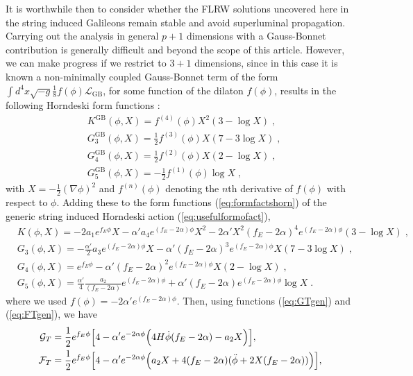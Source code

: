 \documentclass[amsmath,amssymb,11pt]{article}
\newcommand{\beq}{\begin{equation}}
\newcommand{\eeq}{\end{equation}}
\begin{document}
It is worthwhile then to consider whether the FLRW solutions uncovered here in the string induced Galileons remain stable and avoid superluminal propagation. Carrying out the analysis in general $p+1$ dimensions with a Gauss-Bonnet contribution is generally difficult and beyond the scope of this article. However, we can make progress if we restrict to $3+1$ dimensions, since in this case it is known a non-minimally coupled Gauss-Bonnet term of the form $\int d^{4}x\sqrt{-g}\frac{1}{8}f(\phi)\mathcal{L}_{\text{GB}}$, for some function of the dilaton $f(\phi)$, results in the following Horndeski form functions \cite{Kobayashi:2011nu,DeFelice:2011uc}:
\beq 
\begin{split}
&K^{\text{GB}}(\phi,X)=f^{(4)}(\phi)X^{2}(3-\log X)\;,\\
&G^{\text{GB}}_{3}(\phi,X)=\frac{1}{2}f^{(3)}(\phi)X(7-3\log X)\;,\\
&G^{\text{GB}}_{4}(\phi,X)=\frac{1}{2}f^{(2)}(\phi)X(2-\log X)\;,\\
&G^{\text{GB}}_{5}(\phi,X)=-\frac{1}{2}f^{(1)}(\phi)\log X\;,
\end{split}
\eeq
with $X=-\frac{1}{2}(\nabla\phi)^{2}$ and $f^{(n)}(\phi)$ denoting the $n$th derivative of $f(\phi)$ with respect to $\phi$. Adding these to the form functions (\ref{eq:formfactshorn}) of the generic string induced Horndeski action (\ref{eq:usefulformofact}), 
\beq 
\begin{split}
&K(\phi,X)=-2a_1e^{f_{E}\phi}X-\alpha'a_4e^{(f_{E}-2\alpha)\phi}X^2-2\alpha'X^{2}(f_{E}-2\alpha)^{4}e^{(f_{E}-2\alpha)\phi}(3-\log X)\;,\\
&G_{3}(\phi,X)= -\frac{\alpha'}{2}a_3e^{(f_{E}-2\alpha)\phi}X-\alpha'(f_{E}-2\alpha)^{3}e^{(f_{E}-2\alpha)\phi}X(7-3\log X)\;,\\
&G_{4}(\phi,X)=e^{f_{E}\phi}-\alpha' (f_{E}-2\alpha)^{2}e^{(f_{E}-2\alpha)\phi}X(2-\log X)\;,\\
&G_{5}(\phi,X)=\frac{\alpha'}{4}\frac{a_2}{(f_{E}-2\alpha)}e^{(f_{E}-2\alpha)\phi}+\alpha'(f_{E}-2\alpha)e^{(f_{E}-2\alpha)\phi}\log X\;.
\end{split}
\label{eq:formfuncsinduc4d}\eeq
where we used $f(\phi)=-2\alpha' e^{(f_{E}-2\alpha)\phi}$. Then,  using functions (\ref{eq:GTgen}) and (\ref{eq:FTgen}), we have  
\begin{equation}\label{GTandFT}
\begin{split}
\mathcal{G}_T &=\frac{1}{2}e^{f_E\phi}\Big[4-\alpha' e^{-2\alpha\phi}\Big(4H\dot{\phi}(f_E-2\alpha)-a_2X\Big)\Big], \\
\mathcal{F}_T &= \frac{1}{2}e^{f_E\phi}\Big[4-\alpha' e^{-2\alpha\phi}\Big(a_2 X+4(f_E-2\alpha)(\ddot{\phi}+2X(f_E-2\alpha))\Big)\Big],
\end{split}
\end{equation}
\end{document}
